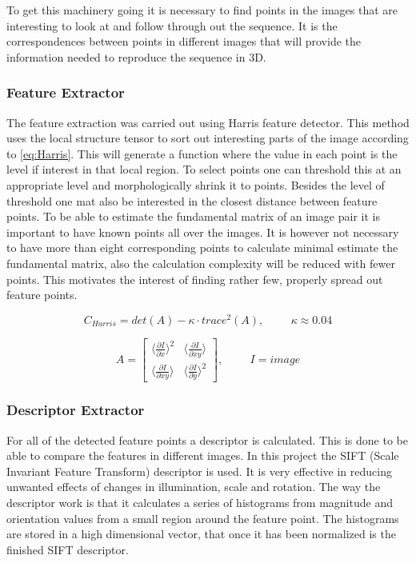 To get this machinery going it is necessary to find points in the images that are interesting to look at and follow through out the sequence. It is the correspondences between points in different images that will provide the information needed to reproduce the sequence in 3D. 

\subsubsection{Feature Extractor}
The feature extraction was carried out using Harris feature detector. This method uses the local structure tensor to sort out interesting parts of the image according to \eqref{eq:Harris}. This will generate a function where the value in each point is the level if interest in that local region. To select points one can threshold this at an appropriate level and morphologically shrink it to points. Besides the level of threshold one mat also be interested in the closest distance between feature points. To be able to estimate the fundamental matrix of an image pair it is important to have known points all over the images. It is however not necessary to have more than eight corresponding points to calculate minimal estimate the fundamental matrix, also the calculation complexity will be reduced with fewer points. This motivates the interest of finding rather few, properly spread out feature points. 

\begin{equation}
\label{eq:Harris}
C_{Harris} = det(A) - \kappa \cdot trace^2(A), \hspace{1cm} \kappa \approx 0.04
\end{equation} 

\begin{equation}
\label{eq:StructureTensor}
A =  \begin{bmatrix}
	   \langle \frac{\partial I}{\partial x} \rangle^2 &  \langle \frac{\partial I}{\partial x y} \rangle \\
	   \langle \frac{\partial I}{\partial x y} \rangle & \langle \frac{\partial I}{\partial y} \rangle^2
	  \end{bmatrix}
	  , \hspace{1cm} I = image
\end{equation}

\subsubsection{Descriptor Extractor}
For all of the detected feature points a descriptor is calculated. This is done to be able to compare the features in different images. In this project the SIFT (Scale Invariant Feature Transform) descriptor is used. It is very effective in reducing unwanted effects of changes in illumination, scale and rotation. The way the descriptor work is that it calculates a series of histograms from magnitude and orientation values from a small region around the feature point. The histograms are stored in a high dimensional vector, that once it has been normalized is the finished SIFT descriptor.

